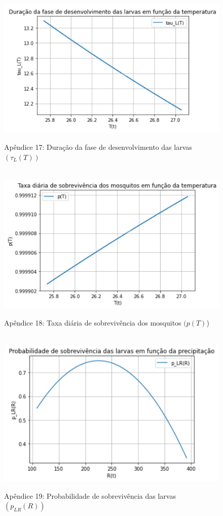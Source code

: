 \documentclass[12pt]{article}
\begin{document}
\newpage
\begin{figure}[!ht]
        \centering
        \hbox{\hspace{2.3em} \includegraphics[scale=1.0] {Plot_tau_L(T)_corrigido.png}}
        \caption*{Apêndice 17: Duração da fase de desenvolvimento das larvas $(\tau_L(T))$} 
\end{figure} 
\begin{figure}[!ht]
        \centering
        \hbox{\hspace{2.5em} \includegraphics[scale=1.0] {Plot_p(T).png}}
        \caption*{Apêndice 18: Taxa diária de sobrevivência dos mosquitos $(p(T)$)} 
\end{figure} 
\newpage
\begin{figure}[!ht]
        \centering
        \hbox{\hspace{3.0em} \includegraphics[scale=1.0] {Plot_p_LR(R).png}}
        \caption*{Apêndice 19: Probabilidade de sobrevivência das larvas $(p_{LR}(R))$} 
\end{figure} 
\end{document}
